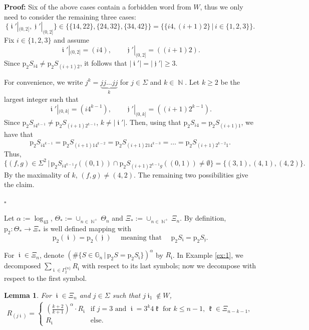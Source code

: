 \documentclass[a4paper, 11pt]{article}
\newenvironment{Proof}{\noindent \textbf{Proof:}}{\hfill$\square$\\}
\DeclareMathOperator{\N}{\mathbb{N}}
\DeclareMathOperator{\iii}{\mathfrak{i}}
\DeclareMathOperator{\jjj}{\mathfrak{j}}
\DeclareMathOperator{\kkk}{\mathfrak{k}}
\numberwithin{equation}{section}
\theoremstyle{plain}
\newtheorem{lemma}[theorem]{Lemma}
\theoremstyle{remark}
\theoremstyle{definition}
\begin{document}
\begin{Proof}
Six of the above cases contain a forbidden word from $W$, thus we only need to consider the remaining three cases:
\[ 
\{\iii'|_{(0,2]}, \jjj'|_{(0,2]} \} \in \big\{\{14,22\},\{24,32\},\{34,42\} \big\} = \big\{ \{i4, (i+1)2\} \, \big| \, i \in \{1,2,3\}\big\}.
 \]
Fix $i\in\{1,2,3\}$ and assume
\[
\iii'|_{(0,2]} = (i4), \qquad \jjj'|_{(0,2]} = ((i+1)2).
\]
Since $\mathrm{p}_2S_{i4} \neq \mathrm{p}_2S_{(i+1)2}$, it follows that $|\iii'|=|\jjj'|\geq 3$.


For convenience, we write \( j^k = \underbrace{jj\dots jj}_k \) for $j\in\Sigma$ and $k\in\N$. Let $k\geq 2$ be the largest integer such that
\[
\iii'|_{(0,k]} = (i4^{k-1}), \qquad \jjj'|_{(0,k]} = ((i+1)2^{k-1}).
\] 
Since $\mathrm{p}_2 S_{i4^{k-1}} \neq \mathrm{p}_2 S_{(i+1)2^{k-1}}$, $k \neq |\iii'|$. Then, using that $\mathrm{p}_2S_{i4} = \mathrm{p}_2S_{(i+1)1}$, we have that
\[
\mathrm{p}_2S_{i4^{k-1}} = \mathrm{p}_2S_{(i+1)14^{k-2}} = \mathrm{p}_2S_{(i+1)214^{k-3}} = \dots = \mathrm{p}_2S_{(i+1)2^{k-2}1}.
\]
Thus, 
\[
\Big\{ (f,g) \in \Sigma^2 \,\Big|\, \mathrm{p}_2 S_{i4^{k-1}f}((0,1)) \cap \mathrm{p}_2 S_{(i+1)2^{k-1}g}((0,1)) \neq \emptyset\Big\} = \{(3,1),(4,1),(4,2)\}.
\]
By the maximality of $k$, $(f,g) \neq (4,2)$. The remaining two possibilities give the claim.


\end{Proof}

Let $\alpha := \log_43$, $\Theta_* := \cup_{n \in \N^+}\Theta_n$ and $\Xi_* := \cup_{n \in \N^+}\Xi_n$. By definition, $\mathrm{p}_2\colon \Theta_*\to\Xi_*$ is well defined mapping with
\[ \mathrm{p}_2 (\iii) = \mathrm{p}_2 (\jjj) \quad \text{ meaning that } \quad \mathrm{p}_2 S_{\iii} = \mathrm{p}_2 S_{\jjj}.\]

For $\iii \in \Xi_n$, denote $(\#\{S\in\mathbb{G}_n\, \big|\, \mathrm{p}_{2} S= \mathrm{p}_2 S_{\iii}\})^{\alpha}$ by $R_{\iii}$. In Example \ref{ex:1}, we decomposed $\sum_{\iii \in \Gamma_2^{\{n\}}}R_{\iii}$ with respect to its last symbols; now we decompose with respect to the first symbol. 


\begin{lemma} \label{ex2l2}
For $\iii \in \Xi_n$ and $j \in \Sigma$ such that $j\iii_1 \notin W$,
\begin{align*}
R_{(j \iii)} = \begin{cases}(\frac{k+2}{k+1})^\alpha \cdot R_{\iii}& \text{if } j = 3 \text{ and } \iii = 3^k4\kkk \text{ for } k \leq n-1,\, \kkk \in \Xi_{n-k-1}, \\ 
R_{\iii} & \text{else}. \end{cases}
\end{align*}
\end{lemma}
\end{document}
